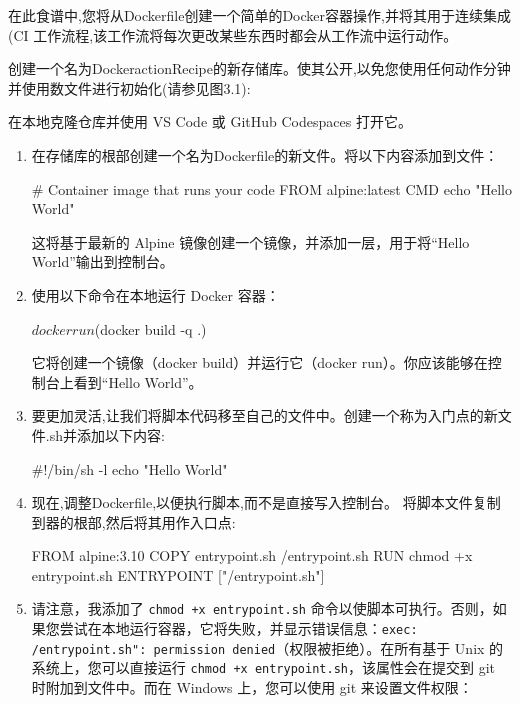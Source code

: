 
在此食谱中,您将从Dockerfile创建一个简单的Docker容器操作,并将其用于连续集成(CI 工作流程,该工作流将每次更改某些东西时都会从工作流中运行动作。


创建一个名为DockeractionRecipe的新存储库。使其公开,以免您使用任何动作分钟并使用数文件进行初始化(请参见图3.1):


在本地克隆仓库并使用 VS Code 或 GitHub Codespaces 打开它。


\begin{enumerate}
\item 
在存储库的根部创建一个名为Dockerfile的新文件。将以下内容添加到文件：

\begin{shell}
# Container image that runs your code
FROM alpine:latest
CMD echo "Hello World"
\end{shell}

这将基于最新的 Alpine 镜像创建一个镜像，并添加一层，用于将“Hello World”输出到控制台。

\item 
使用以下命令在本地运行 Docker 容器：

\begin{shell}
$ docker run $(docker build -q .)
\end{shell}

它将创建一个镜像（docker build）并运行它（docker run）。你应该能够在控制台上看到“Hello World”。

\item 
要更加灵活,让我们将脚本代码移至自己的文件中。创建一个称为入门点的新文件.sh并添加以下内容:

\begin{shell}
#!/bin/sh -l
echo "Hello World"
\end{shell}

\item 
现在,调整Dockerfile,以便执行脚本,而不是直接写入控制台。 将脚本文件复制到器的根部,然后将其用作入口点:

\begin{shell}
FROM alpine:3.10
COPY entrypoint.sh /entrypoint.sh
RUN chmod +x entrypoint.sh
ENTRYPOINT ["/entrypoint.sh"]
\end{shell}

\item 
请注意，我添加了 \verb|chmod +x entrypoint.sh| 命令以使脚本可执行。否则，如果您尝试在本地运行容器，它将失败，并显示错误信息：\verb|exec: /entrypoint.sh": permission denied|（权限被拒绝）。在所有基于 Unix 的系统上，您可以直接运行 \verb|chmod +x entrypoint.sh|，该属性会在提交到 git 时附加到文件中。而在 Windows 上，您可以使用 git 来设置文件权限：


\end{enumerate}
